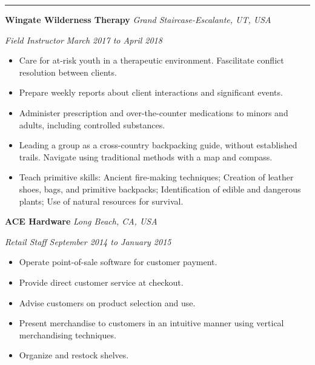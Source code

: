 \documentclass[10pt, a4paper]{article}
\newcommand{\rangesep}{to\xspace}  %
\renewcommand{\date}[1]{\textit{#1}}
\newcommand{\location}[1]{\textit{#1}}
\newcommand{\heading}[1]{
    \makebox[0pt][l]{\Large \sc \hspace{2pt}#1}
    \rule[-0.7ex]{\columnwidth}{0.5pt}\vspace{1.0ex}
}
\newcommand{\subheading}[1]{{\bfseries #1}}
\newcommand{\subheadSkip}{\vspace{0.7ex}}
\newenvironment{mysection}[1]
{\vspace{2.5ex}
\heading{#1}
\begin{adjustwidth}{0.3cm}{0cm}}
{\end{adjustwidth} }
\begin{document}
    \newpage
    \begin{mysection}{Employment \large{(continued)}}

        \subheadSkip
        \subheading{Wingate Wilderness Therapy} \hfill \location{Grand Staircase-Escalante, UT, USA}

        \vspace{0.1ex}
        \textit{Field Instructor} \hfill \date{March 2017 \rangesep April 2018}
        \begin{itemize}
            \item Care for at-risk youth in a therapeutic environment. Fascilitate conflict resolution between clients. 
            \item Prepare weekly reports about client interactions and significant events. 
            \item Administer prescription and over-the-counter medications to minors and adults, including controlled substances.
            \item Leading a group as a cross-country backpacking guide, without established trails. Navigate using traditional methods with a map and compass.
            \item Teach primitive skills: Ancient fire-making techniques; Creation of leather shoes, bags, and primitive backpacks; Identification of edible and dangerous plants; Use of natural resources for survival.
        \end{itemize}

        \subheadSkip
        \subheading{ACE Hardware} \hfill \location{Long Beach, CA, USA}

        \vspace{0.1ex}
        \textit{Retail Staff} \hfill \date{September 2014 \rangesep January 2015}
        \begin{itemize}
            \item Operate point-of-sale software for customer payment.
            \item Provide direct customer service at checkout. 
            \item Advise customers on product selection and use.
            \item Present merchandise to customers in an intuitive manner using vertical merchandising techniques.
            \item Organize and restock shelves.
        \end{itemize}
    \end{mysection} 
\end{document}
